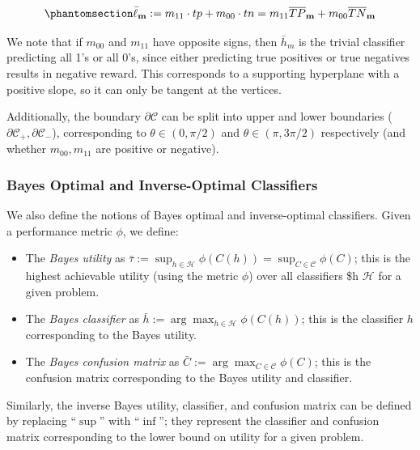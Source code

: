 \documentclass[
  letterpaper,
  numbers=noenddot,
  DIV=11]{scrreprt}
\providecommand{\tightlist}{%
  \setlength{\itemsep}{0pt}\setlength{\parskip}{0pt}}\usepackage{longtable,booktabs,array}
\theoremstyle{definition}
\theoremstyle{plain}
\theoremstyle{plain}
\theoremstyle{remark}
\begin{document}
\begin{equation}\phantomsection\label{eq-eq3.47}{\bar{\ell}_{\mathbf{m}} := m_{11} \cdot tp + m_{00} \cdot tn = m_{11} \overline{TP}_{\mathbf{m}} + m_{00} \overline{TN}_{\mathbf{m}}}\end{equation}

We note that if \(m_{00}\) and \(m_{11}\) have opposite signs, then
\(\bar{h}_m\) is the trivial classifier predicting all 1's or all 0's,
since either predicting true positives or true negatives results in
negative reward. This corresponds to a supporting hyperplane with a
positive slope, so it can only be tangent at the vertices.

Additionally, the boundary \(\partial \mathcal{C}\) can be split into
upper and lower boundaries
(\(\partial \mathcal{C}_{+}, \partial \mathcal{C}_{-}\)), corresponding
to \(\theta \in (0, \pi/2)\) and \(\theta \in (\pi, 3\pi/2)\)
respectively (and whether \(m_{00}, m_{11}\) are positive or negative).

\subsubsection*{Bayes Optimal and Inverse-Optimal
Classifiers}\label{bayes-optimal-and-inverse-optimal-classifiers}

We also define the notions of Bayes optimal and inverse-optimal
classifiers. Given a performance metric \(\phi\), we define:

\begin{itemize}
\tightlist
\item
  The \emph{Bayes utility} as
  \(\bar{\tau} := \sup_{h \in \mathcal{H}} \phi(C(h)) = \sup_{C \in \mathcal{C}} \phi(C)\);
  this is the highest achievable utility (using the metric \(\phi\))
  over all classifiers \$h \in \(\mathcal{H}\) for a given problem.
\item
  The \emph{Bayes classifier} as
  \(\bar{h} := \arg \max_{h \in \mathcal{H}} \phi(C(h))\); this is the
  classifier \(h\) corresponding to the Bayes utility.
\item
  The \emph{Bayes confusion matrix} as
  \(\bar{C} := \arg \max_{C \in \mathcal{C}} \phi(C)\); this is the
  confusion matrix corresponding to the Bayes utility and classifier.
\end{itemize}

Similarly, the inverse Bayes utility, classifier, and confusion matrix
can be defined by replacing ``\(\sup\)'' with ``\(\inf\)''; they
represent the classifier and confusion matrix corresponding to the lower
bound on utility for a given problem.
\end{document}
